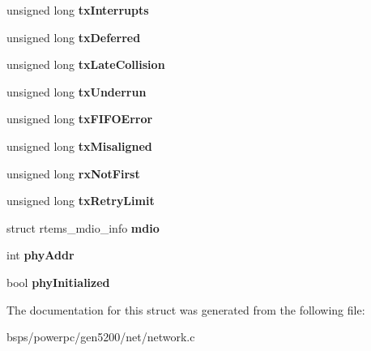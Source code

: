 \begin{DoxyCompactItemize}
\mbox{\label{structmpc5200__fec__context_a25cf4e0c44bac1b510aa928d27caafd5}} 
unsigned long {\bfseries tx\+Interrupts}
\item 
\mbox{\label{structmpc5200__fec__context_a283920e076751dd8cab2cd782588d3a7}} 
unsigned long {\bfseries tx\+Deferred}
\item 
\mbox{\label{structmpc5200__fec__context_af05e14c9997b59ece1b63a473afaac84}} 
unsigned long {\bfseries tx\+Late\+Collision}
\item 
\mbox{\label{structmpc5200__fec__context_ad657a6f881164fb1a1a2ec67e8362388}} 
unsigned long {\bfseries tx\+Underrun}
\item 
\mbox{\label{structmpc5200__fec__context_a425949dfe5a9cd28278e6b42204dc2b5}} 
unsigned long {\bfseries tx\+F\+I\+F\+O\+Error}
\item 
\mbox{\label{structmpc5200__fec__context_a99bf08a275eac32ba6236f968383883b}} 
unsigned long {\bfseries tx\+Misaligned}
\item 
\mbox{\label{structmpc5200__fec__context_a9d5f0defc52882eaf6daf3938b38339f}} 
unsigned long {\bfseries rx\+Not\+First}
\item 
\mbox{\label{structmpc5200__fec__context_a42906ebf69c2985c92e01106eaddd4a9}} 
unsigned long {\bfseries tx\+Retry\+Limit}
\item 
\mbox{\label{structmpc5200__fec__context_a0e885ad06a43b497679ec643c5aca0c3}} 
struct rtems\+\_\+mdio\+\_\+info {\bfseries mdio}
\item 
\mbox{\label{structmpc5200__fec__context_a0af15198fb5c4a84d6776f88e11518c4}} 
int {\bfseries phy\+Addr}
\item 
\mbox{\label{structmpc5200__fec__context_a9587badb80306181b4c8ad3a1b309975}} 
bool {\bfseries phy\+Initialized}
\end{DoxyCompactItemize}


The documentation for this struct was generated from the following file\+:\begin{DoxyCompactItemize}
\item 
bsps/powerpc/gen5200/net/network.\+c\end{DoxyCompactItemize}
